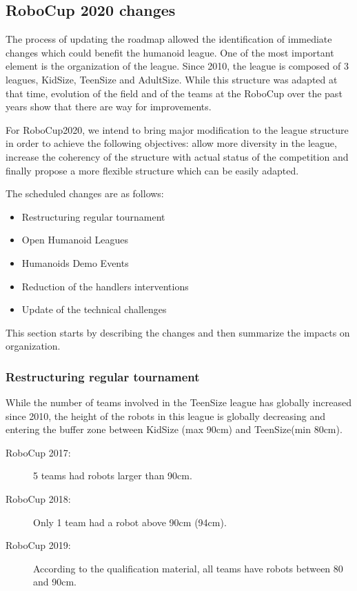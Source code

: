 \documentclass{article}
\begin{document}
\subsection{RoboCup 2020 changes}

The process of updating the roadmap allowed the identification of immediate changes which
could benefit the humanoid league.
One of the most important element is the organization of the league. Since 2010,
the league is composed of 3 leagues, KidSize, TeenSize and AdultSize.
While this structure was adapted at that time, evolution of the field and of the
teams at the RoboCup over the past years show that there are way for improvements.

For RoboCup2020, we intend to bring major modification to the league structure
in order to achieve the following objectives:
allow more diversity in the league,
increase the coherency of the structure with actual status of the competition
and finally propose a more flexible structure which can be easily adapted.

The scheduled changes are as follows:
\begin{itemize}
\item Restructuring regular tournament
\item Open Humanoid Leagues
\item Humanoids Demo Events
\item Reduction of the handlers interventions
\item Update of the technical challenges
\end{itemize}

This section starts by describing the changes and then summarize the impacts on
organization.


\subsubsection{Restructuring regular tournament}

While the number of teams involved in the TeenSize league has globally increased
since 2010, the height of the robots in this league is globally decreasing and
entering the buffer zone between KidSize (max 90cm) and TeenSize(min 80cm).
\begin{description}
\item[RoboCup 2017:] 5 teams had robots larger than 90cm.
\item[RoboCup 2018:] Only 1 team had a robot above 90cm (94cm).
\item[RoboCup 2019:] According to the qualification material, all teams have
  robots between 80 and 90cm.
\end{description}
\end{document}
